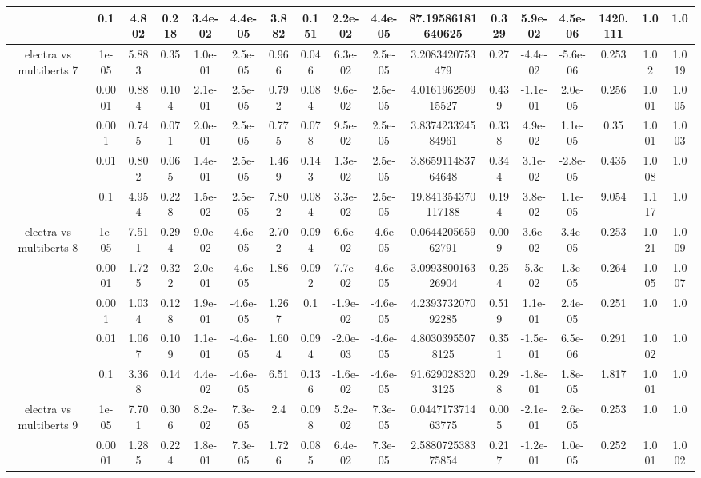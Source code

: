 \begin{tabular}{|c|c|c|c|c|c|c|c|c|c|c|c|c|c|c|c|c|}
 & 0.1 & 4.802 & 0.218 & 3.4e-02 & 4.4e-05 & 3.882 & 0.151 & 2.2e-02 & 4.4e-05 & 87.19586181640625 & 0.329 & 5.9e-02 & 4.5e-06 & 1420.111 & 1.0 & 1.0 \\
\hline
\multirow{5}{*}{electra  vs multiberts 7} & 1e-05 & 5.883 & 0.35 & 1.0e-01 & 2.5e-05 & 0.966 & 0.046 & 6.3e-02 & 2.5e-05 & 3.2083420753479 & 0.27 & -4.4e-02 & -5.6e-06 & 0.253 & 1.02 & 1.019 \\
 & 0.0001 & 0.884 & 0.104 & 2.1e-01 & 2.5e-05 & 0.792 & 0.084 & 9.6e-02 & 2.5e-05 & 4.016196250915527 & 0.439 & -1.1e-01 & 2.0e-05 & 0.256 & 1.001 & 1.005 \\
 & 0.001 & 0.745 & 0.071 & 2.0e-01 & 2.5e-05 & 0.775 & 0.078 & 9.5e-02 & 2.5e-05 & 3.837423324584961 & 0.338 & 4.9e-02 & 1.1e-05 & 0.35 & 1.001 & 1.003 \\
 & 0.01 & 0.802 & 0.065 & 1.4e-01 & 2.5e-05 & 1.469 & 0.143 & 1.3e-02 & 2.5e-05 & 3.865911483764648 & 0.344 & 3.1e-02 & -2.8e-05 & 0.435 & 1.008 & 1.0 \\
 & 0.1 & 4.954 & 0.228 & 1.5e-02 & 2.5e-05 & 7.802 & 0.084 & 3.3e-02 & 2.5e-05 & 19.841354370117188 & 0.194 & 3.8e-02 & 1.1e-05 & 9.054 & 1.117 & 1.0 \\
\hline
\multirow{5}{*}{electra  vs multiberts 8} & 1e-05 & 7.511 & 0.294 & 9.0e-02 & -4.6e-05 & 2.702 & 0.094 & 6.6e-02 & -4.6e-05 & 0.064420565962791 & 0.009 & 3.6e-02 & 3.4e-05 & 0.253 & 1.021 & 1.009 \\
 & 0.0001 & 1.725 & 0.322 & 2.0e-01 & -4.6e-05 & 1.86 & 0.092 & 7.7e-02 & -4.6e-05 & 3.099380016326904 & 0.254 & -5.3e-02 & 1.3e-05 & 0.264 & 1.005 & 1.007 \\
 & 0.001 & 1.034 & 0.128 & 1.9e-01 & -4.6e-05 & 1.267 & 0.1 & -1.9e-02 & -4.6e-05 & 4.239373207092285 & 0.519 & 1.1e-01 & 2.4e-05 & 0.251 & 1.0 & 1.0 \\
 & 0.01 & 1.067 & 0.109 & 1.1e-01 & -4.6e-05 & 1.604 & 0.094 & -2.0e-03 & -4.6e-05 & 4.80303955078125 & 0.351 & -1.5e-01 & 6.5e-06 & 0.291 & 1.002 & 1.0 \\
 & 0.1 & 3.368 & 0.14 & 4.4e-02 & -4.6e-05 & 6.51 & 0.136 & -1.6e-02 & -4.6e-05 & 91.6290283203125 & 0.298 & -1.8e-01 & 1.8e-05 & 1.817 & 1.001 & 1.0 \\
\hline
\multirow{5}{*}{electra  vs multiberts 9} & 1e-05 & 7.701 & 0.306 & 8.2e-02 & 7.3e-05 & 2.4 & 0.098 & 5.2e-02 & 7.3e-05 & 0.044717371463775 & 0.005 & -2.1e-01 & 2.6e-05 & 0.253 & 1.0 & 1.0 \\
 & 0.0001 & 1.285 & 0.224 & 1.8e-01 & 7.3e-05 & 1.726 & 0.085 & 6.4e-02 & 7.3e-05 & 2.588072538375854 & 0.217 & -1.2e-01 & 1.0e-05 & 0.252 & 1.001 & 1.002 \\

\end{tabular}
